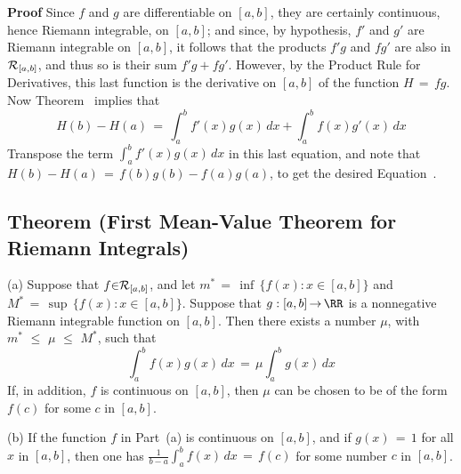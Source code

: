 \V

        {\bf Proof} Since $f$ and $g$ are differentiable on $[a,b]$, they are certainly continuous, hence Riemann integrable, on $[a,b]$;
    and since, by hypothesis, $f'$  and $g'$ are Riemann integrable on $[a,b]$, it follows that the products $f'g$ and $fg'$ are also in ${\cal R}_{[a,b]}$, and thus so is their sum $f'g+fg'$.
    However, by the Product Rule for Derivatives, this last function is the derivative on $[a,b]$ of the function $H \,=\, fg$.
    Now Theorem~ implies that
        \begin{displaymath}
        H(b) - H(a) \,=\, \int_{a}^{b} f'(x)g(x)\,dx + \int_{a}^{b} f(x)g'(x)\,dx
        \end{displaymath}
    Transpose the term ${\displaystyle \int_{a}^{b} f'(x)g(x)\,dx}$ in this last equation, and note that $H(b)-H(a) \,=\, f(b)g(b) - f(a)g(a)$, to get the desired Equation~.


\V
\V

        \subsection{\small{{\bf Theorem} (First Mean-Value Theorem for Riemann Integrals)}}
        \label{ThmH50.30}

\V

        (a) Suppose that $f{\in}{\cal R}_{[a,b]}$, and let $m^{{\ast}} \,=\, {\inf}\,\{f(x): x{\in}[a,b]\}$ and $M^{{\ast}} \,=\, {\sup}\,\{f(x): x{\in}[a,b]\}$.
    Suppose that $g:[a,b] \,{\rightarrow}\, {\RR}$ is a nonnegative Riemann integrable function on $[a,b]$.
    Then there exists a number ${\mu}$, with $m^{{\ast}}\,\,{\leq}\,\,{\mu}\,\,{\leq}\,\,M^{{\ast}}$,
    such that
        \begin{displaymath}
        \int_{a}^{b} f(x)g(x)\,dx \,=\, {\mu}\int_{a}^{b} g(x)\,dx
        \end{displaymath}
    If, in addition, $f$ is continuous on $[a,b]$, then ${\mu}$ can be chosen to be of the form $f(c)$ for some $c$ in $[a,b]$.

\V


        (b) If the function $f$ in Part~(a) is continuous on $[a,b]$, and if $g(x) \,=\, 1$ for all $x$ in $[a,b]$, 
    then one has ${\displaystyle \frac{1}{b-a}\int_{a}^{b} f(x)\,dx \,=\, f(c)}$ for some number $c$ in $[a,b]$.

\V

